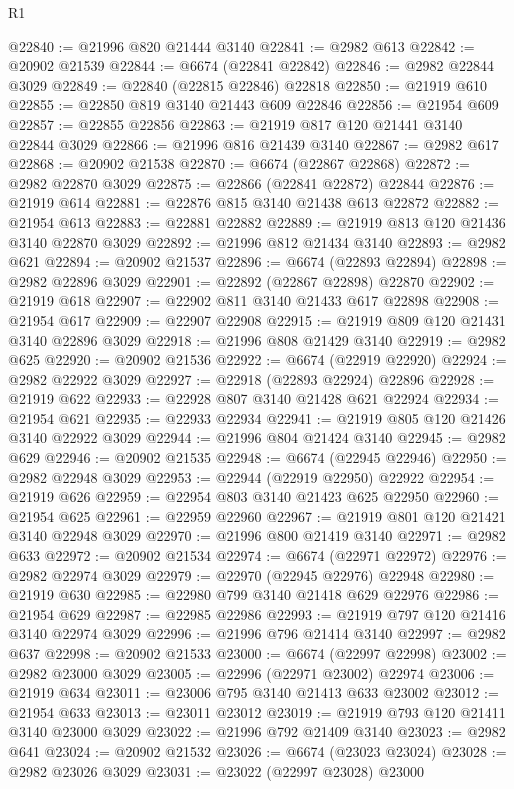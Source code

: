 \begin{lexlean}{R1}
\begin{coremodule}
@22840 := @21996 @820 @21444 @3140
@22841 := @2982 @613
@22842 := @20902 @21539
@22844 := @6674 (@22841 @22842)
@22846 := @2982 @22844 @3029
@22849 := @22840 (@22815 @22846) @22818
@22850 := @21919 @610
@22855 := @22850 @819 @3140 @21443 @609 @22846
@22856 := @21954 @609
@22857 := @22855 @22856
@22863 := @21919 @817 @120 @21441 @3140 @22844 @3029
@22866 := @21996 @816 @21439 @3140
@22867 := @2982 @617
@22868 := @20902 @21538
@22870 := @6674 (@22867 @22868)
@22872 := @2982 @22870 @3029
@22875 := @22866 (@22841 @22872) @22844
@22876 := @21919 @614
@22881 := @22876 @815 @3140 @21438 @613 @22872
@22882 := @21954 @613
@22883 := @22881 @22882
@22889 := @21919 @813 @120 @21436 @3140 @22870 @3029
@22892 := @21996 @812 @21434 @3140
@22893 := @2982 @621
@22894 := @20902 @21537
@22896 := @6674 (@22893 @22894)
@22898 := @2982 @22896 @3029
@22901 := @22892 (@22867 @22898) @22870
@22902 := @21919 @618
@22907 := @22902 @811 @3140 @21433 @617 @22898
@22908 := @21954 @617
@22909 := @22907 @22908
@22915 := @21919 @809 @120 @21431 @3140 @22896 @3029
@22918 := @21996 @808 @21429 @3140
@22919 := @2982 @625
@22920 := @20902 @21536
@22922 := @6674 (@22919 @22920)
@22924 := @2982 @22922 @3029
@22927 := @22918 (@22893 @22924) @22896
@22928 := @21919 @622
@22933 := @22928 @807 @3140 @21428 @621 @22924
@22934 := @21954 @621
@22935 := @22933 @22934
@22941 := @21919 @805 @120 @21426 @3140 @22922 @3029
@22944 := @21996 @804 @21424 @3140
@22945 := @2982 @629
@22946 := @20902 @21535
@22948 := @6674 (@22945 @22946)
@22950 := @2982 @22948 @3029
@22953 := @22944 (@22919 @22950) @22922
@22954 := @21919 @626
@22959 := @22954 @803 @3140 @21423 @625 @22950
@22960 := @21954 @625
@22961 := @22959 @22960
@22967 := @21919 @801 @120 @21421 @3140 @22948 @3029
@22970 := @21996 @800 @21419 @3140
@22971 := @2982 @633
@22972 := @20902 @21534
@22974 := @6674 (@22971 @22972)
@22976 := @2982 @22974 @3029
@22979 := @22970 (@22945 @22976) @22948
@22980 := @21919 @630
@22985 := @22980 @799 @3140 @21418 @629 @22976
@22986 := @21954 @629
@22987 := @22985 @22986
@22993 := @21919 @797 @120 @21416 @3140 @22974 @3029
@22996 := @21996 @796 @21414 @3140
@22997 := @2982 @637
@22998 := @20902 @21533
@23000 := @6674 (@22997 @22998)
@23002 := @2982 @23000 @3029
@23005 := @22996 (@22971 @23002) @22974
@23006 := @21919 @634
@23011 := @23006 @795 @3140 @21413 @633 @23002
@23012 := @21954 @633
@23013 := @23011 @23012
@23019 := @21919 @793 @120 @21411 @3140 @23000 @3029
@23022 := @21996 @792 @21409 @3140
@23023 := @2982 @641
@23024 := @20902 @21532
@23026 := @6674 (@23023 @23024)
@23028 := @2982 @23026 @3029
@23031 := @23022 (@22997 @23028) @23000

\end{coremodule}
\end{lexlean}
